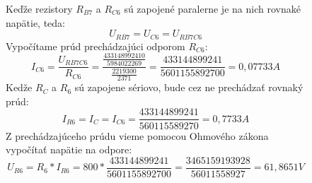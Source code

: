 \begin{figure}[!ht]
\begin{center}
    
    Keďže rezistory $R_{B7}$ a $R_{C6}$ sú zapojené paralerne je na nich rovnaké napätie, teda:
    \[
        U_{RB7} = U_{C6} = U_{RB7C6}
    \]
    Vypočítame prúd prechádzajúci odporom $R_{C6}$:
    \[
        I_{C6} = \frac{U_{RB7C6}}{R_{C6}} = 
        \frac{\frac{433148992410}{5984022269}}{\frac{2219300}{2371}} = 
        \frac{433144899241}{5601155892700} = 0,07733 A
    \]
    Kedže $R_C$ a $R_6$ sú zapojene sériovo, bude cez ne prechádzať rovnaký prúd:
    \[
        I_{R6} = I_C = I_{C6} = \frac{433144899241}{560115589270} = 0,7733 A
    \]
    Z prechádzajúceho prúdu vieme pomocou Ohmového zákona vypočítať napätie na odpore:
    \[
        U_{R6} = R_6 * I_{R6} = 
        800 * \frac{433144899241}{5601155892700} = 
        \frac{3465159193928}{56011558927} = 61,8651 V
    \]
\end{center}
\end{figure}

